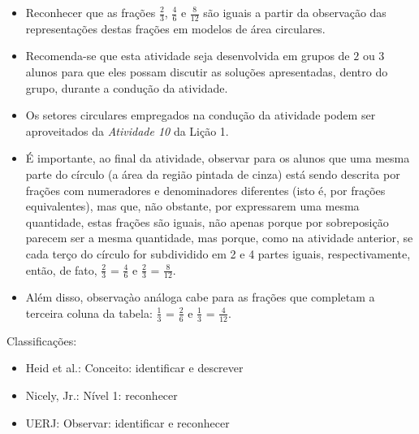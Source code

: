 \documentclass[oneside]{book}
\begin{document}
\begin{multicols}{2}
\begin{itemize} %
    \item       Reconhecer que as frações       $\frac{2}{3}$,       
$\frac{4}{6}$       e       $\frac{8}{12}$       são iguais a partir da 
observação das representações destas frações em modelos de área circulares. 
\end{itemize} %
  
 
\begin{itemize} %
    \item       Recomenda-se que esta atividade seja desenvolvida em grupos de   
    $2$       ou       $3$       alunos para que eles possam discutir as 
soluções apresentadas, dentro do grupo, durante a condução da atividade.
    \item       Os setores circulares empregados na condução da atividade podem 
ser aproveitados da \emph{Atividade 10}       da Lição 1.
    \item       É importante, ao final da atividade, observar para os alunos que 
uma mesma parte do círculo (a área da região pintada de cinza) está sendo 
descrita por frações com numeradores e denominadores diferentes (isto é, por 
frações equivalentes), mas que, não obstante, por expressarem uma mesma 
quantidade, estas frações são iguais, não apenas porque por sobreposição parecem 
ser a mesma quantidade, mas porque, como na atividade anterior, se cada terço do 
círculo for subdividido em 2 e 4 partes iguais, respectivamente, então, de fato, 
      $\frac{2}{3}$       =       $\frac{4}{6}$       e       $\frac{2}{3}$      
 =       $\frac{8}{12}$.
    \item       Além disso, observaçào análoga cabe para as frações que 
completam a terceira coluna da tabela:       $\frac{1}{3}$       =       
$\frac{2}{6}$       e       $\frac{1}{3}$       =       $\frac{4}{12}$.
\end{itemize} %
  
  Classificações:  
\begin{itemize} %
    \item       Heid et al.: Conceito: identificar e descrever
    \item       Nicely, Jr.: Nível 1: reconhecer
    \item       UERJ: Observar: identificar e reconhecer
\end{itemize} %


\end{multicols}
\end{document}
